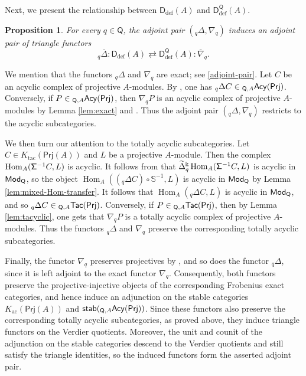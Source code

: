 \documentclass{amsart}
\theoremstyle{bfupright head,slanted body}
\theoremstyle{bfupright head,upright body}
\theoremstyle{fixed bf head,slanted body}
\newtheorem{prp}[res]{Proposition}      \newtheorem*{prp*}{Proposition}
\theoremstyle{fixed bf head,upright body}
\theoremstyle{numbered paragraph}
\newenvironment{prf*}[1][Proof]{%
	\begin{proof}[\bf #1]
		\setcounter{equation}{0}
		\renewcommand{\theequation}{\arabic{equation}}}
	{\end{proof}
}
\numberwithin{equation}{res}
\newcommand{\TacQ}{{}_{\Q,A}\mathsf{Tac}(\sf Prj)}
\newcommand{\AcQ}{{}_{\Q,A}\mathsf{Acy}(\sf Prj)}
\newcommand{\Prj}[1]{\mathsf{Prj}(#1)}
\newcommand{\Hom}{\operatorname{Hom}}
\newcommand{\Q}{\mathsf{Q}}
\newcommand{\kk}{\Bbbk}
\newcommand{\rMod}[1]{{\sf{Mod}}_{#1}}
\begin{document}
Next, we present the relationship between $\mathsf D_{\mathrm{def}}(A)$ and $\mathsf D_{\mathrm{def}}^{\Q}(A)$.

\begin{prp}\label{thm:defect-adjunction}
For every $q\in\Q$, the adjoint pair $({}_q\Delta, \nabla_q)$ induces an adjoint pair of triangle functors
$${}_q\overline{\Delta}:\mathsf D_{\mathrm{def}}(A) \rightleftarrows
\mathsf D_{\mathrm{def}}^{\Q}(A):\overline{\nabla}_q.$$
\end{prp}

\begin{prf*}
We mention that the functors ${}_q\Delta$ and $\nabla_q$ are exact; see \ref{adjoint-pair}. Let $C$ be an acyclic complex of
projective $A$-modules. By \cite[Lemmas 4.8$(i)$ and 4.9]{HJ26}, one has ${}_q\Delta C\in\AcQ$. Conversely, if $P\in\AcQ$, then $\nabla_qP$ is an acyclic complex of projective $A$-modules by Lemma \ref{lem:exact} and \cite[Lemma 3.5$(ii)$]{HJ26}. Thus the adjoint pair $({}_q\Delta, \nabla_q)$ restricts to the acyclic subcategories.

We then turn our attention to the totally acyclic subcategories. Let $C\in K_{\mathrm{tac}}(\Prj A)$ and $L$ be a projective $A$-module. Then the complex $\Hom_A({\sf\Sigma}^{-1}C,L)$ is acyclic. It follows from \cite[Lemma 4.10]{HJ26} that
$\widetilde{\Delta}_q^{\kk}\Hom_A({\sf\Sigma}^{-1}C,L)$ is acyclic in $\rMod{\Q}$, so the object $\Hom_A(({}_q\Delta C)\circ\mathbb S^{-1},L)$ is acyclic in $\rMod{\Q}$ by Lemma \ref{lem:mixed-Hom-transfer}. It follows that $\Hom_A({}_q\Delta C,L)$ is acyclic in $\rMod{\Q}$, and so ${}_q\Delta C\in\TacQ$. Conversely, if $P\in\TacQ$, then by Lemma \ref{lem:tacyclic}, one gets that $\nabla_qP$ is a totally acyclic complex of projective $A$-modules. Thus the functors ${}_q\Delta$ and $\nabla_q$ preserve the corresponding totally acyclic subcategories.

Finally, the functor $\nabla_q$ preserves projectives by \cite[Lemma 3.11(i)]{HJ26}, and so does the functor ${}_q\Delta$, since it is left adjoint to the exact functor $\nabla_q$. Consequently, both functors preserve the projective-injective objects of the corresponding Frobenius exact categories, and hence induce an adjunction on the stable categories $K_{\mathrm{ac}}(\Prj A)$ and $\mathsf{stab}(\AcQ)$. Since these functors also preserve the corresponding totally acyclic subcategories, as proved above, they induce triangle functors on the Verdier quotients. Moreover, the unit and counit of the adjunction on the stable categories descend to the Verdier quotients and still satisfy the triangle identities, so the induced functors form the asserted adjoint pair.
\end{prf*}
\end{document}
